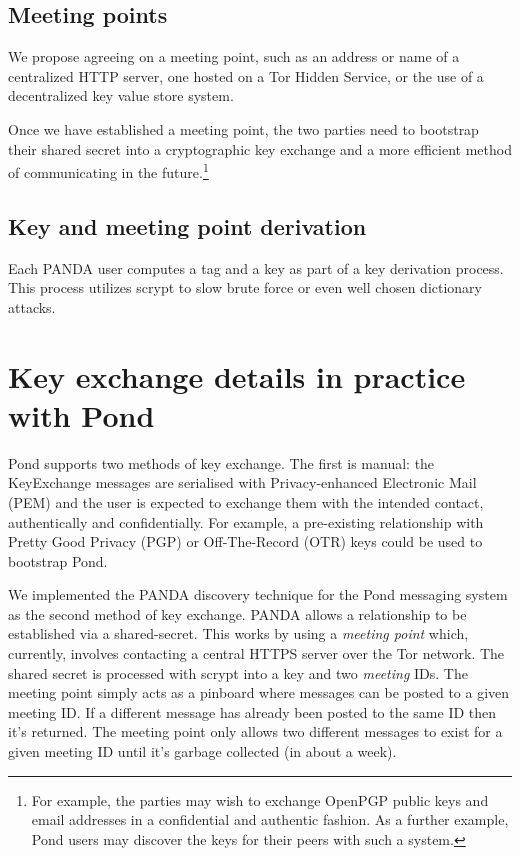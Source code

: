 \documentclass[letterpaper,twocolumn,10pt]{article}
\begin{document}
\subsection{Meeting points}

We propose agreeing on a meeting point, such as an address or name of a
centralized HTTP server, one hosted on a Tor Hidden
Service\cite{Dingledine04tor:the}, or the use of a
decentralized key value store system.

Once we have established a meeting point, the two parties need to bootstrap
their shared secret into a cryptographic key exchange and a more efficient
method of communicating in the future.\footnote{For example, the parties may wish to
exchange OpenPGP public keys and email addresses in a confidential and
authentic fashion. As a further example, Pond users may discover the
keys for their peers with such a system.}

\subsection{Key and meeting point derivation}

Each PANDA user computes a tag and a key as part of a key derivation process.
This process utilizes scrypt\cite{scrypt} to slow brute force or
even well chosen dictionary attacks.

\section{Key exchange details in practice with Pond}

Pond supports two methods of key exchange. The first is manual: the
KeyExchange messages are serialised with Privacy-enhanced Electronic Mail (PEM)\cite{pem} and the user is expected to
exchange them with the intended contact, authentically and confidentially. For
example, a pre-existing relationship with Pretty Good Privacy (PGP)\cite{pgp} or
Off-The-Record (OTR)\cite{otr} keys could be used to bootstrap Pond.

We implemented\cite{panda} the PANDA discovery technique for the
Pond\cite{pond} messaging system as the second method of key exchange. PANDA
allows a relationship to be established via a shared-secret. This works by
using a {\it meeting point} which, currently, involves contacting a central
HTTPS server over the Tor\cite{Dingledine04tor:the} network. The shared secret is processed with
scrypt\cite{scrypt} into a key and two {\it meeting} IDs. The meeting point
simply acts as a pinboard where messages can be posted to a given meeting ID.
If a different message has already been posted to the same ID then it's
returned. The meeting point only allows two different messages to exist for a
given meeting ID until it's garbage collected (in about a week).
\end{document}
